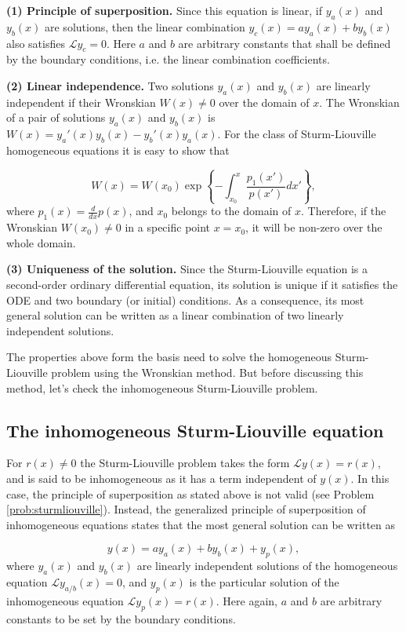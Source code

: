 \noindent
\textbf{(1) Principle of superposition.} Since this equation is linear, if $y_a(x)$ and $y_b(x)$ are solutions, then the linear combination $y_{c}(x) = a y_a(x) + b y_b(x)$ also satisfies $\mathcal{L}y_{c} = 0$. Here $a$ and $b$ are arbitrary constants that shall be defined by the boundary conditions, i.e. the linear combination coefficients.

\noindent
\textbf{(2) Linear independence.} Two solutions $y_a(x)$ and $y_b(x)$ are linearly independent if their Wronskian $W(x) \neq 0$ over the domain of $x$. The Wronskian of a pair of solutions $y_a(x)$ and $y_b(x)$ is $W(x) = y_a'(x) y_b(x) -y_b'(x)y_a(x)$. For the class of Sturm-Liouville homogeneous equations it is easy to show that 

\begin{equation}
 W(x) = W(x_0) \exp\left\{-\int_{x_0}^x \dfrac{p_1(x')}{p(x')}dx'\right\},
\end{equation}
where $p_1(x) = \frac{d}{dx} p(x)$, and $x_0$ belongs to the domain of $x$. Therefore, if the Wronskian $W(x_0) \neq 0$ in a specific point $x = x_0$, it will be non-zero over the whole domain.

\noindent
\textbf{(3) Uniqueness of the solution.} Since the Sturm-Liouville equation is a second-order ordinary differential equation, its solution is unique if it satisfies the ODE and two boundary (or initial) conditions. As a consequence, its most general solution can be written as a linear combination of two linearly independent solutions.

The properties above form the basis need to solve the homogeneous Sturm-Liouville problem using the Wronskian method. But before discussing this method, let's check the inhomogeneous Sturm-Liouville problem.

\subsection*{The inhomogeneous Sturm-Liouville equation}

For $r(x)\neq 0$ the Sturm-Liouville problem takes the form $\mathcal{L}y(x) = r(x)$, and is said to be inhomogeneous as it has a term independent of $y(x)$. In this case, the principle of superposition as stated above is not valid (see Problem \ref{prob:sturmliouville}). Instead, the generalized principle of superposition of inhomogeneous equations states that the most general solution can be written as

\begin{equation}
 y(x) = a y_a(x) + b y_b(x) + y_p(x),
 \label{eq:WronskianFull}
\end{equation}
where $y_a(x)$ and $y_b(x)$ are linearly independent solutions of the homogeneous equation $\mathcal{L}y_{a/b}(x) = 0$, and $y_p(x)$ is the particular solution of the inhomogeneous equation $\mathcal{L}y_p(x) = r(x)$. Here again, $a$ and $b$ are arbitrary constants to be set by the boundary conditions.

